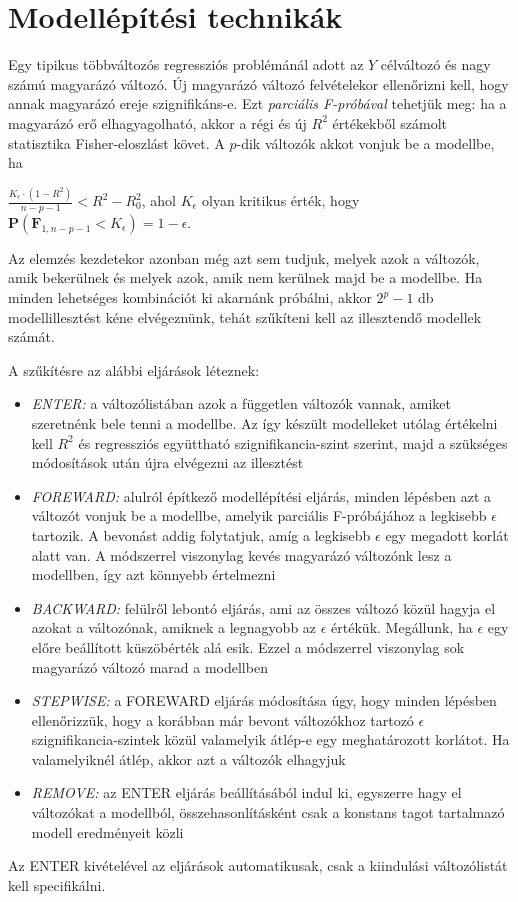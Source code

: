 \section{Modellépítési technikák}

Egy tipikus többváltozós regressziós problémánál adott az $Y$ célváltozó és nagy számú magyarázó változó. Új magyarázó változó felvételekor ellenőrizni kell, hogy annak magyarázó ereje szignifikáns-e. Ezt \emph{parciális F-próbával} tehetjük meg: ha a magyarázó erő elhagyagolható, akkor a régi és új $R^2$ értékekből számolt statisztika Fisher-eloszlást követ. A $p$-dik változók akkot vonjuk be a modellbe, ha

$\frac{K_\epsilon \cdot (1-R^2)}{n-p-1} < R^2 -R_0^2$, ahol $K_\epsilon$ olyan kritikus érték, hogy $\mathbf{P}(\mathbf{F}_{1,n-p-1} < K_\epsilon) = 1-\epsilon$.

Az elemzés kezdetekor azonban még azt sem tudjuk, melyek azok a változók, amik bekerülnek és melyek azok, amik nem kerülnek majd be a modellbe. Ha minden lehetséges kombinációt ki akarnánk próbálni, akkor $2^p-1$ db modellillesztést kéne elvégeznünk, tehát szűkíteni kell az illesztendő modellek számát.

A szűkítésre az alábbi eljárások léteznek:
\begin{itemize}
\item \emph{ENTER:} a változólistában azok a független változók vannak, amiket szeretnénk bele tenni a modellbe. Az így készült modelleket utólag értékelni kell $R^2$ és regressziós együttható szignifikancia-szint szerint, majd a szükséges módosítások után újra elvégezni az illesztést
\item \emph{FOREWARD:} alulról építkező modellépítési eljárás, minden lépésben azt a változót vonjuk be a modellbe, amelyik parciális F-próbájához a legkisebb $\epsilon$ tartozik. A bevonást addig folytatjuk, amíg a legkisebb $\epsilon$ egy megadott korlát alatt van. A módszerrel viszonylag kevés magyarázó változónk lesz a modellben, így azt könnyebb értelmezni
\item \emph{BACKWARD:} felülről lebontó eljárás, ami az összes változó közül hagyja el azokat a változónak, amiknek a legnagyobb az $\epsilon$ értékük. Megállunk, ha $\epsilon$ egy előre beállított küszöbérték alá esik. Ezzel a módszerrel viszonylag sok magyarázó változó marad a modellben
\item \emph{STEPWISE:} a FOREWARD eljárás módosítása úgy, hogy minden lépésben ellenőrizzük, hogy a korábban már bevont változókhoz tartozó $\epsilon$ szignifikancia-szintek közül valamelyik átlép-e egy meghatározott korlátot. Ha valamelyiknél átlép, akkor azt a változók elhagyjuk
\item \emph{REMOVE:} az ENTER eljárás beállításából indul ki, egyszerre hagy el változókat a modellból, összehasonlításként csak a konstans tagot tartalmazó modell eredményeit közli
\end{itemize}
Az ENTER kivételével az eljárások automatikusak, csak a kiindulási változólistát kell specifikálni.

